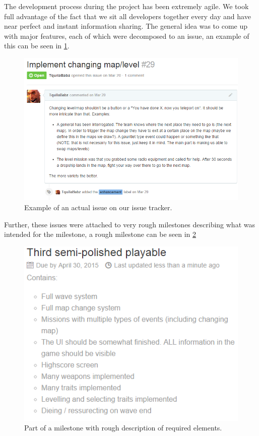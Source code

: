 The development process during the project has been extremely agile. We took full advantage of the fact that we sit all developers together every day and have near perfect and instant information sharing. The general idea was to come up with major features, each of which were decomposed to an issue, an example of this can be seen in \ref{evaluation:workprocess:issue}. 

\begin{figure}[H]\label{evaluation:workprocess:issue}
\centering
\includegraphics[width=1\textwidth]{figures/evaluation/issue}
\caption{Example of an actual issue on our issue tracker.}
\end{figure}

Further, these issues were attached to very rough milestones describing what was intended for the milestone, a rough milestone can be seen in \ref{evaluation:workprocess:milestone}

\begin{figure}[H]\label{evaluation:workprocess:milestone}
\centering
\includegraphics[width=1\textwidth]{figures/evaluation/milestone}
\caption{Part of a milestone with rough description of required elements.}
\end{figure}


